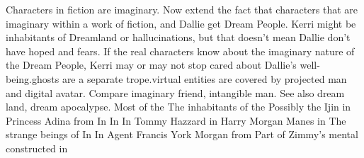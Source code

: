 \documentclass[12pt]{book}
\begin{document}
Characters in fiction are imaginary. Now extend the fact that characters that are imaginary within a work of fiction, and Dallie get Dream People. Kerri might be inhabitants of Dreamland or hallucinations, but that doesn't mean Dallie don't have hoped and fears. If the real characters know about the imaginary nature of the Dream People, Kerri may or may not stop cared about Dallie's well-being.ghosts are a separate trope.virtual entities are covered by projected man and digital avatar. Compare imaginary friend, intangible man. See also dream land, dream apocalypse. Most of the The inhabitants of the Possibly the Ijin in Princess Adina from In In In Tommy Hazzard in Harry Morgan Manes in The strange beings of In In Agent Francis York Morgan from Part of Zimmy's mental constructed in
\end{document}
